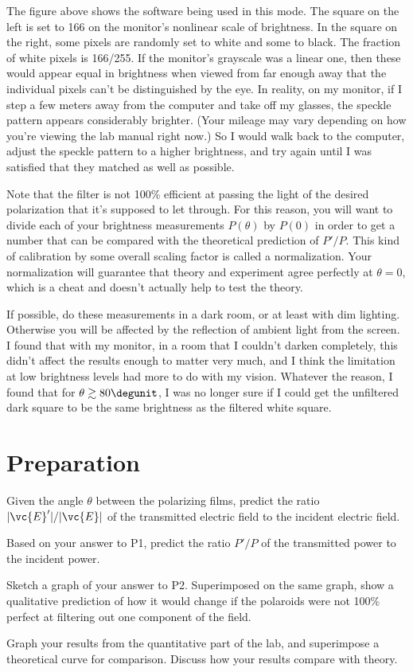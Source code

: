 
The figure above shows the software being used in this mode. The square on the left
is set to 166 on the monitor's nonlinear scale of brightness. In the square on the right,
some pixels are randomly set to white and some to black. The fraction of white pixels
is 166/255. If the monitor's grayscale was a linear one, then these would appear
equal in brightness when viewed from far enough away that the individual pixels can't
be distinguished by the eye. In reality, on my monitor, if I step a few meters away from the computer and
take off my glasses, the speckle pattern appears considerably brighter. (Your mileage may
vary depending on how you're viewing the lab manual right now.) So I would walk back to the
computer, adjust the speckle pattern to a higher brightness, and try again until I was
satisfied that they matched as well as possible.

Note that the filter is not 100\% efficient at passing the light of the desired polarization
that it's supposed to let through. For this reason, you will want to divide each of your
brightness measurements $P(\theta)$ by $P(0)$ in order to get a number that can be
compared with the theoretical prediction of $P'/P$. This kind of calibration by
some overall scaling factor is called a normalization. Your normalization will guarantee
that theory and experiment agree perfectly at $\theta=0$, which is a cheat and doesn't
actually help to test the theory.

If possible, do these measurements in a dark room, or at least with dim lighting. Otherwise
you will be affected by the reflection of ambient light from the screen.
I found that with my monitor, in a room that I couldn't darken completely,
this didn't affect the results enough to matter very much, and I think the limitation
at low brightness levels had more to do with my vision.
Whatever the reason, I found that for $\theta\gtrsim 80\degunit$, I was no longer sure if I could
get the unfiltered dark square to be the same brightness as the filtered white square.


\section*{Preparation}

\prelabquestion Given the angle $\theta$ between the polarizing films, predict the 
ratio $|\vc{E}'|/|\vc{E}|$ of the transmitted electric field to the incident
electric field.

\prelabquestion Based on your answer to P1, predict the ratio $P'/P$ of the transmitted
power to the incident power.

\prelabquestion Sketch a graph of your answer to P2. Superimposed on the same graph, show
a qualitative prediction of how it would change if the polaroids were not
100\% perfect at filtering out one component of the field.

\analysis

Graph your results from the quantitative part of the lab, and superimpose a
theoretical curve for comparison. Discuss how your results
compare with theory.

